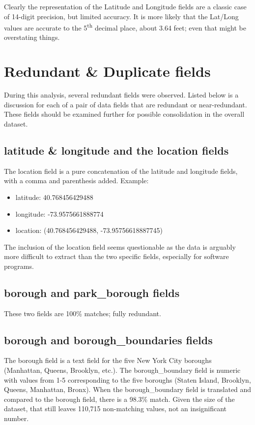 \documentclass[12pt, titlepage]{article}
\begin{document}
{Clearly the representation of the Latitude and Longitude fields are a 
classic case of 14-digit precision, but limited accuracy. It is more likely 
that the Lat/Long values are accurate to the 5\textsuperscript{th} decimal place, 
about 3.64 feet; even that might be overstating things. 



\section{Redundant \& Duplicate fields}\label{sec:duplicates}
During this analysis, several redundant fields were observed. Listed below 
is a discussion for each of a pair of data fields that are redundant or 
near-redundant. These fields should be examined further for 
possible consolidation in the overall dataset.

\subsection{latitude \& longitude and the location fields}  The location field is a 
pure concatenation of the latitude and longitude fields, with a comma and 
parenthesis added. Example:  

	\begin{itemize}
		\item  latitude: 40.768456429488
		\item  longitude: -73.9575661888774
		\item  location: (40.768456429488, -73.95756618887745)
	\end{itemize}

The inclusion of the location field seems questionable as the data is 
arguably more difficult to extract than the two specific fields, especially 
for software programs.

\subsection{borough and park\_borough fields}  These two fields are 
100\% matches; fully redundant.

\subsection{borough and borough\_boundaries fields}  The borough field 
is a text field for the five New York City boroughs (Manhattan, Queens, 
Brooklyn, etc.). The borough\_boundary field is numeric with values 
from 1-5 corresponding to the five boroughs (Staten Island, Brooklyn, 
Queens, Manhattan, Bronx). When the borough\_boundary field is 
translated and compared to the borough field, there is a 
98.3\% match. Given the size of the dataset, that still leaves 
110,715 non-matching values, not an insignificant number.  

}
\end{document}
